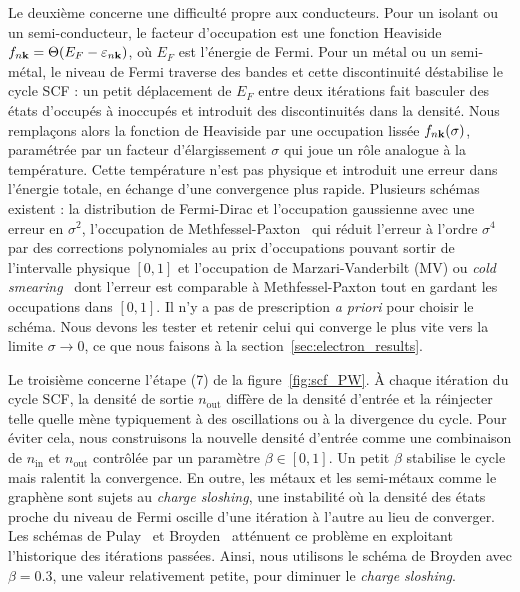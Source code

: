 Le deuxième concerne une difficulté propre aux conducteurs. Pour un isolant ou un semi-conducteur, le facteur d'occupation est une fonction Heaviside $f_{n\mathbf{k}}=\Theta(E_F-\varepsilon_{n\mathbf{k}})$, où $E_F$ est l'énergie de Fermi. Pour un métal ou un semi-métal, le niveau de Fermi traverse des bandes et cette discontinuité déstabilise le cycle SCF : un petit déplacement de $E_F$ entre deux itérations fait basculer des états d'occupés à inoccupés et introduit des discontinuités dans la densité. Nous remplaçons alors la fonction de Heaviside par une occupation lissée $f_{n\mathbf{k}}(\sigma)$, paramétrée par un facteur d'élargissement $\sigma$ qui joue un rôle analogue à la température. Cette température n'est pas physique et introduit une erreur dans l'énergie totale, en échange d'une convergence plus rapide. Plusieurs schémas existent : la distribution de Fermi-Dirac et l'occupation gaussienne avec une erreur en $\sigma^2$, l'occupation de Methfessel-Paxton~\cite{methfesselHighprecisionSamplingBrillouinzone1989} qui réduit l'erreur à l'ordre $\sigma^4$ par des corrections polynomiales au prix d'occupations pouvant sortir de l'intervalle physique $[0,1]$ et l'occupation de Marzari-Vanderbilt (MV) ou \textit{cold smearing}~\cite{marzariThermalContractionDisordering1999} dont l'erreur est comparable à Methfessel-Paxton tout en gardant les occupations dans $[0,1]$. Il n'y a pas de prescription \textit{a priori} pour choisir le schéma. Nous devons les tester et retenir celui qui converge le plus vite vers la limite $\sigma\to 0$, ce que nous faisons à la section~\ref{sec:electron_results}.


Le troisième concerne l'étape (7) de la figure~\ref{fig:scf_PW}. À chaque itération du cycle SCF, la densité de sortie $n_\text{out}$ diffère de la densité d'entrée et la réinjecter telle quelle mène typiquement à des oscillations ou à la divergence du cycle. Pour éviter cela, nous construisons la nouvelle densité d'entrée comme une combinaison de $n_\text{in}$ et $n_\text{out}$ contrôlée par un paramètre $\beta\in[0,1]$. Un petit $\beta$ stabilise le cycle mais ralentit la convergence. En outre, les métaux et les semi-métaux comme le graphène sont sujets au \textit{charge sloshing}, une instabilité où la densité des états proche du niveau de Fermi oscille d'une itération à l'autre au lieu de converger. Les schémas de Pulay~\cite{pulayConvergenceAccelerationIterative1980} et Broyden~\cite{broydenClassMethodsSolving1965} atténuent ce problème en exploitant l'historique des itérations passées. Ainsi, nous utilisons le schéma de Broyden avec $\beta=0.3$, une valeur relativement petite, pour diminuer le \textit{charge sloshing}.

